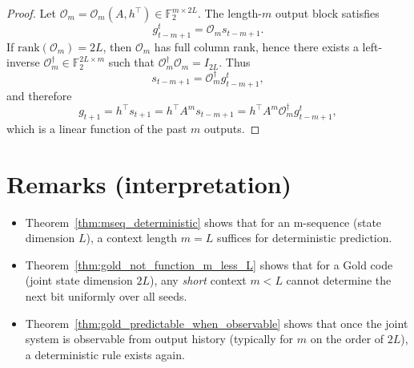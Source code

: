 \documentclass[12pt,a4paper]{report}
\newcommand{\F}{\mathbb{F}}
\newcommand{\rank}{\mathrm{rank}}
\theoremstyle{plain}
\begin{document}
\begin{proof}
Let $\mathcal{O}_m=\mathcal{O}_m(A,h^\top)\in \F_2^{m\times 2L}$.
The length-$m$ output block satisfies
\[
g_{t-m+1}^t = \mathcal{O}_m s_{t-m+1}.
\]
If $\rank(\mathcal{O}_m)=2L$, then $\mathcal{O}_m$ has full column rank, hence there exists
a left-inverse $\mathcal{O}_m^\dagger\in \F_2^{2L\times m}$ such that
$\mathcal{O}_m^\dagger \mathcal{O}_m = I_{2L}$.
Thus
\[
s_{t-m+1}=\mathcal{O}_m^\dagger g_{t-m+1}^t,
\]
and therefore
\[
g_{t+1} = h^\top s_{t+1}
= h^\top A^{m} s_{t-m+1}
= h^\top A^{m}\mathcal{O}_m^\dagger g_{t-m+1}^t,
\]
which is a linear function of the past $m$ outputs.
\end{proof}

\section{Remarks (interpretation)}
\begin{itemize}
\item Theorem~\ref{thm:mseq_deterministic} shows that for an m-sequence (state dimension $L$),
a context length $m=L$ suffices for deterministic prediction.
\item Theorem~\ref{thm:gold_not_function_m_less_L} shows that for a Gold code (joint state dimension $2L$),
any \emph{short} context $m<L$ cannot determine the next bit uniformly over all seeds.
\item Theorem~\ref{thm:gold_predictable_when_observable} shows that once the joint system is observable
from output history (typically for $m$ on the order of $2L$), a deterministic rule exists again.
\end{itemize}
\end{document}

